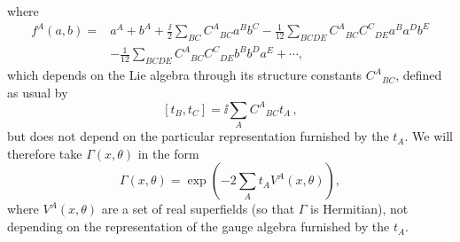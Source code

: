 where
\begin{equation}
  \begin{aligned}
  f^A(a,b)={}&a^A+b^A
  +\frac{\ii}{2}\sum_{BC}C^A{}_{BC}a^B b^C
  -\frac1{12}\sum_{BCDE}C^A{}_{BC}C^C{}_{DE}a^B a^D b^E
  \\
  &-\frac1{12}\sum_{BCDE}C^A{}_{BC}C^C{}_{DE}b^B b^D a^E
  +\cdots,
  \end{aligned}
  \tag{27.1.9}\label{eq:27.1.9}
\end{equation}
which depends on the Lie algebra through its structure constants
\(C^A{}_{BC}\), defined as usual by
\[
  [t_B,t_C]=\ii\sum_A C^A{}_{BC}t_A\,,
\]
but does not depend on the particular representation furnished by the
\(t_A\). We will therefore take \(\Gamma(x,\theta)\) in the form
\begin{equation}
  \Gamma(x,\theta)
  =\exp\left(-2\sum_A t_A V^A(x,\theta)\right),
  \tag{27.1.10}\label{eq:27.1.10}
\end{equation}
where \(V^A(x,\theta)\) are a set of real superfields (so that \(\Gamma\)
is Hermitian), not depending on the representation of the gauge algebra
furnished by the \(t_A\).

